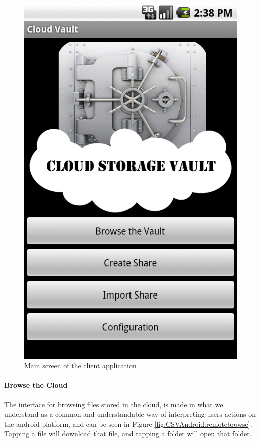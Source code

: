 \documentclass[pdftex,english,10pt,b5paper,twoside]{book}
\begin{document}
\begin{figure}[h!]
    \centering
    \includegraphics[scale=0.4]{client-mainscreen.png}
    \caption{Main screen of the client application}
    \label{fig:CSVAndroid:mainscreen}
\end{figure}

\paragraph{Browse the Cloud}

The interface for browsing files stored in the cloud, is made in what we
understand as a common and understandable way of interpreting users actions on
the android platform, and can be seen in Figure
\ref{fig:CSVAndroid:remotebrowse}. Tapping a file will download that file, and
tapping a folder will open that folder.
\end{document}
